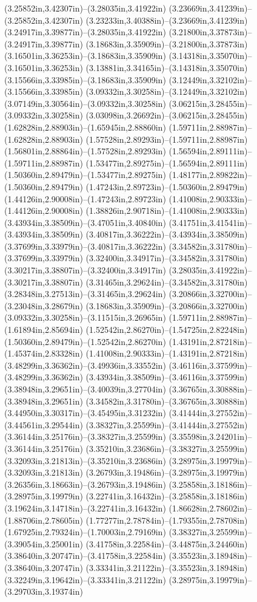 (3.25852in,3.42307in)--(3.28035in,3.41922in) (3.23669in,3.41239in)--(3.25852in,3.42307in) (3.23233in,3.40388in)--(3.23669in,3.41239in) (3.24917in,3.39877in)--(3.28035in,3.41922in) (3.21800in,3.37873in)--(3.24917in,3.39877in) (3.18683in,3.35909in)--(3.21800in,3.37873in) (3.16501in,3.36253in)--(3.18683in,3.35909in) (3.14318in,3.35070in)--(3.16501in,3.36253in) (3.13881in,3.34165in)--(3.14318in,3.35070in) (3.15566in,3.33985in)--(3.18683in,3.35909in) (3.12449in,3.32102in)--(3.15566in,3.33985in) (3.09332in,3.30258in)--(3.12449in,3.32102in) (3.07149in,3.30564in)--(3.09332in,3.30258in) (3.06215in,3.28455in)--(3.09332in,3.30258in) (3.03098in,3.26692in)--(3.06215in,3.28455in) (1.62828in,2.88903in)--(1.65945in,2.88860in) (1.59711in,2.88987in)--(1.62828in,2.88903in) (1.57528in,2.89293in)--(1.59711in,2.88987in) (1.56801in,2.88864in)--(1.57528in,2.89293in) (1.56594in,2.89111in)--(1.59711in,2.88987in) (1.53477in,2.89275in)--(1.56594in,2.89111in) (1.50360in,2.89479in)--(1.53477in,2.89275in) (1.48177in,2.89822in)--(1.50360in,2.89479in) (1.47243in,2.89723in)--(1.50360in,2.89479in) (1.44126in,2.90008in)--(1.47243in,2.89723in) (1.41008in,2.90333in)--(1.44126in,2.90008in) (1.38826in,2.90718in)--(1.41008in,2.90333in) (3.43934in,3.38509in)--(3.47051in,3.40840in) (3.41751in,3.41541in)--(3.43934in,3.38509in) (3.40817in,3.36222in)--(3.43934in,3.38509in) (3.37699in,3.33979in)--(3.40817in,3.36222in) (3.34582in,3.31780in)--(3.37699in,3.33979in) (3.32400in,3.34917in)--(3.34582in,3.31780in) (3.30217in,3.38807in)--(3.32400in,3.34917in) (3.28035in,3.41922in)--(3.30217in,3.38807in) (3.31465in,3.29624in)--(3.34582in,3.31780in) (3.28348in,3.27513in)--(3.31465in,3.29624in) (3.20866in,3.32700in)--(3.23048in,3.28679in) (3.18683in,3.35909in)--(3.20866in,3.32700in) (3.09332in,3.30258in)--(3.11515in,3.26965in) (1.59711in,2.88987in)--(1.61894in,2.85694in) (1.52542in,2.86270in)--(1.54725in,2.82248in) (1.50360in,2.89479in)--(1.52542in,2.86270in) (1.43191in,2.87218in)--(1.45374in,2.83328in) (1.41008in,2.90333in)--(1.43191in,2.87218in) (3.48299in,3.36362in)--(3.49936in,3.33552in) (3.46116in,3.37599in)--(3.48299in,3.36362in) (3.43934in,3.38509in)--(3.46116in,3.37599in) (3.38948in,3.29651in)--(3.40039in,3.27704in) (3.36765in,3.30888in)--(3.38948in,3.29651in) (3.34582in,3.31780in)--(3.36765in,3.30888in) (3.44950in,3.30317in)--(3.45495in,3.31232in) (3.41444in,3.27552in)--(3.44561in,3.29544in) (3.38327in,3.25599in)--(3.41444in,3.27552in) (3.36144in,3.25176in)--(3.38327in,3.25599in) (3.35598in,3.24201in)--(3.36144in,3.25176in) (3.35210in,3.23686in)--(3.38327in,3.25599in) (3.32093in,3.21813in)--(3.35210in,3.23686in) (3.28975in,3.19979in)--(3.32093in,3.21813in) (3.26793in,3.19486in)--(3.28975in,3.19979in) (3.26356in,3.18663in)--(3.26793in,3.19486in) (3.25858in,3.18186in)--(3.28975in,3.19979in) (3.22741in,3.16432in)--(3.25858in,3.18186in) (3.19624in,3.14718in)--(3.22741in,3.16432in) (1.86628in,2.78602in)--(1.88706in,2.78605in) (1.77277in,2.78784in)--(1.79355in,2.78708in) (1.67925in,2.79324in)--(1.70003in,2.79169in) (3.38327in,3.25599in)--(3.39054in,3.25001in) (3.41758in,3.22584in)--(3.44875in,3.24460in) (3.38640in,3.20747in)--(3.41758in,3.22584in) (3.35523in,3.18948in)--(3.38640in,3.20747in) (3.33341in,3.21122in)--(3.35523in,3.18948in) (3.32249in,3.19642in)--(3.33341in,3.21122in) (3.28975in,3.19979in)--(3.29703in,3.19374in) 